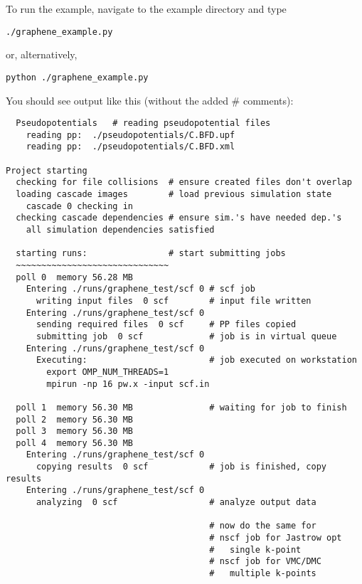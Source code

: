\documentclass[oneside,11pt]{memoir}
\numberwithin{equation}{section}
\begin{document}
To run the example, navigate to the example directory and type
\begin{shaded}
\begin{verbatim}
./graphene_example.py
\end{verbatim}
\end{shaded}
or, alternatively, 
\begin{shaded}
\begin{verbatim}
python ./graphene_example.py
\end{verbatim}
\end{shaded}

You should see output like this (without the added \# comments):
\begin{shaded}
\begin{verbatim}
  Pseudopotentials   # reading pseudopotential files
    reading pp:  ./pseudopotentials/C.BFD.upf
    reading pp:  ./pseudopotentials/C.BFD.xml

Project starting 
  checking for file collisions  # ensure created files don't overlap
  loading cascade images        # load previous simulation state
    cascade 0 checking in 
  checking cascade dependencies # ensure sim.'s have needed dep.'s
    all simulation dependencies satisfied 
  
  starting runs:                # start submitting jobs
  ~~~~~~~~~~~~~~~~~~~~~~~~~~~~~~ 
  poll 0  memory 56.28 MB 
    Entering ./runs/graphene_test/scf 0 # scf job
      writing input files  0 scf        # input file written 
    Entering ./runs/graphene_test/scf 0 
      sending required files  0 scf     # PP files copied
      submitting job  0 scf             # job is in virtual queue
    Entering ./runs/graphene_test/scf 0 
      Executing:                        # job executed on workstation
        export OMP_NUM_THREADS=1
        mpirun -np 16 pw.x -input scf.in 

  poll 1  memory 56.30 MB               # waiting for job to finish
  poll 2  memory 56.30 MB 
  poll 3  memory 56.30 MB 
  poll 4  memory 56.30 MB 
    Entering ./runs/graphene_test/scf 0 
      copying results  0 scf            # job is finished, copy results
    Entering ./runs/graphene_test/scf 0 
      analyzing  0 scf                  # analyze output data

                                        # now do the same for
                                        # nscf job for Jastrow opt
                                        #   single k-point
                                        # nscf job for VMC/DMC
                                        #   multiple k-points


\end{verbatim}
\end{shaded}
\end{document}
